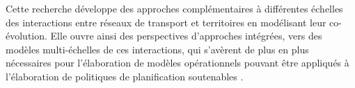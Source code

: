 \documentclass[11pt]{article}
\begin{document}
Cette recherche développe des approches complémentaires à différentes échelles des interactions entre réseaux de transport et territoires en modélisant leur co-évolution. Elle ouvre ainsi des perspectives d'approches intégrées, vers des modèles multi-échelles de ces interactions, qui s'avèrent de plus en plus nécessaires pour l'élaboration de modèles opérationnels pouvant être appliqués à l'élaboration de politiques de planification soutenables \citep{rozenblat2018conclusion}.









\end{document}
